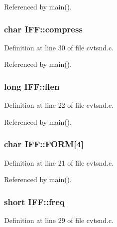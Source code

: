 Referenced by main().

\hypertarget{structIFF_a969e7c9fdb899c4597cb79beb7bf7b2b}{
\subsubsection[{compress}]{\setlength{\rightskip}{0pt plus 5cm}char I\+F\+F\+::compress}}\label{structIFF_a969e7c9fdb899c4597cb79beb7bf7b2b}


Definition at line 30 of file cvtsnd.\+c.



Referenced by main().

\hypertarget{structIFF_adef91099995fc9f3a2d2793e72973364}{
\subsubsection[{flen}]{\setlength{\rightskip}{0pt plus 5cm}long I\+F\+F\+::flen}}\label{structIFF_adef91099995fc9f3a2d2793e72973364}


Definition at line 22 of file cvtsnd.\+c.



Referenced by main().

\hypertarget{structIFF_a03c5d9d6498d0775ac5b5de8d32d6fc6}{
\subsubsection[{F\+O\+R\+M}]{\setlength{\rightskip}{0pt plus 5cm}char I\+F\+F\+::\+F\+O\+R\+M\mbox{[}4\mbox{]}}}\label{structIFF_a03c5d9d6498d0775ac5b5de8d32d6fc6}


Definition at line 21 of file cvtsnd.\+c.



Referenced by main().

\hypertarget{structIFF_a04d30d1a382ea7c06a0ca69b801318ad}{
\subsubsection[{freq}]{\setlength{\rightskip}{0pt plus 5cm}short I\+F\+F\+::freq}}\label{structIFF_a04d30d1a382ea7c06a0ca69b801318ad}


Definition at line 29 of file cvtsnd.\+c.



